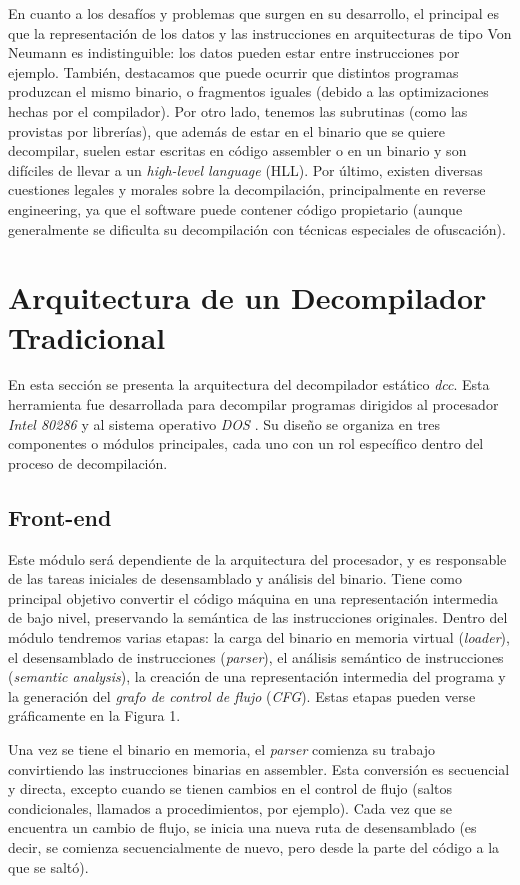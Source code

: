 \documentclass[runningheads]{llncs}
\begin{document}
En cuanto a los desafíos y problemas que surgen en su desarrollo, el principal es que la representación
de los datos y las instrucciones en arquitecturas de tipo Von Neumann es indistinguible: los datos pueden
estar entre instrucciones por ejemplo. También, destacamos que puede ocurrir que distintos programas
produzcan el mismo binario, o fragmentos iguales (debido a las optimizaciones hechas por el compilador).
Por otro lado, tenemos las subrutinas (como las provistas por librerías), que además de estar en el binario
que se quiere decompilar, suelen estar escritas en código assembler o en un binario y son difíciles de 
llevar a un \textit{high-level language} (HLL).  Por último, existen diversas cuestiones legales y morales
sobre la decompilación, principalmente en reverse engineering, ya que el software puede contener
código propietario (aunque generalmente se dificulta su decompilación con técnicas especiales de
ofuscación).

%
\section{Arquitectura de un Decompilador Tradicional}
En esta sección se presenta la arquitectura del decompilador estático \textit{dcc}. Esta herramienta
fue desarrollada para decompilar programas dirigidos al procesador \textit{Intel 80286} y al sistema
operativo \textit{DOS} \cite{cifuentes-dcc}. Su diseño se organiza en tres componentes o módulos principales, cada uno
con un rol específico dentro del proceso de decompilación.

\subsection{Front-end}
Este módulo será dependiente de la arquitectura del procesador, y es responsable de las tareas iniciales 
de desensamblado y análisis del binario. Tiene como principal objetivo convertir el código máquina en 
una representación intermedia de bajo nivel, preservando la semántica de las instrucciones originales.
Dentro del módulo tendremos varias etapas: la carga del binario en memoria virtual (\textit{loader}),
el desensamblado de instrucciones (\textit{parser}), el análisis semántico de instrucciones
(\textit{semantic analysis}), la creación de una representación intermedia del programa y la generación
del \textit{grafo de control de flujo} (\textit{CFG}). Estas etapas pueden verse gráficamente 
en la Figura 1.

Una vez se tiene el binario en memoria, el \textit{parser} comienza su trabajo convirtiendo las
instrucciones binarias en assembler. Esta conversión es secuencial y directa, excepto cuando se tienen
cambios en el control de flujo (saltos condicionales, llamados a procedimientos, por ejemplo). Cada vez
que se encuentra un cambio de flujo, se inicia una nueva ruta de desensamblado (es decir, se comienza
secuencialmente de nuevo, pero desde la parte del código a la que se saltó). 
\end{document}
